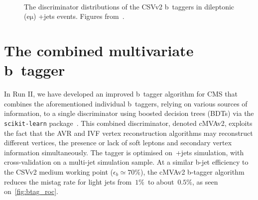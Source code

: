\begin{figure}
\begin{centering}
 \\
\caption[The CSVv2 b~tagger discriminator distributions]{The discriminator distributions of the CSVv2 b~taggers in dileptonic ($\mathrm{e\mu}$) \ttbar+jets events. Figures from~\cite{CMS-PAS-BTV-15-001}.}
\label{fig:btag_csv}
\end{centering}
\end{figure}

\section{The combined multivariate b~tagger}
In Run II, we have developed an improved b~tagger algorithm for CMS that combines the aforementioned individual b~taggers, relying on various sources of information, to a single discriminator using boosted decision trees (BDTs) via the \texttt{scikit-learn} package~\cite{scikit-learn}. This combined discriminator, denoted cMVAv2, exploits the fact that the AVR and IVF vertex reconstruction algorithms may reconstruct different vertices, the presence or lack of soft leptons and secondary vertex information simultaneously. The tagger is optimised on~\ttbar+jets simulation, with cross-validation on a multi-jet simulation sample. At a similar b-jet efficiency to the CSVv2 medium working point ($\epsilon_b \simeq 70\%$), the cMVAv2 b-tagger algorithm reduces the mistag rate for light jets from~$1\%$~to about~$0.5\%$, as seen on~\cref{fig:btag_roc}.

